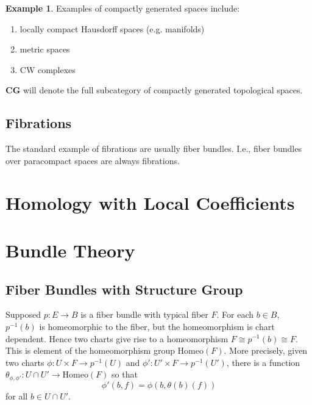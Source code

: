 \documentclass{article}
\theoremstyle{definition}
\newtheorem{ex}{Example}[section]
\newcommand{\cat}{\mathbf}
\begin{document}
    \begin{ex}
    Examples of compactly generated spaces include:
    \begin{enumerate}
    \item locally compact Hausdorff spaces (e.g. manifolds)
    \item metric spaces
    \item CW complexes
    \end{enumerate}
    \end{ex}
 $\cat{CG}$ will denote the full subcategory of compactly generated topological spaces. 
 \subsection{Fibrations}
 The standard example of fibrations are usually fiber bundles. I.e., fiber bundles over paracompact spaces are always fibrations. 
    \section{Homology with Local Coefficients}
    \section{Bundle Theory}
    \subsection{Fiber Bundles with Structure Group}
    Supposed $p:E\rightarrow B$ is a fiber bundle with typical fiber $F$. For each $b\in B$, $p^{-1}(b)$ is homeomorphic to the fiber, but the homeomorphism is chart dependent. Hence two charts give rise to a homeomorphism $F\cong p^{-1}(b)\cong F$. This is element of the homeomorphism group Homeo$(F)$. More precisely, given two charts $\phi:U\times F\rightarrow p^{-1}(U)$ and 
    $\phi':U'\times F\rightarrow p^{-1}(U')$, there is a function $\theta_{\phi,\phi'}:U\cap U'\rightarrow \text{Homeo}(F)$ so that 
    \[\phi'(b,f)=\phi(b,\theta(b)(f))\] for all $b\in U\cap U'.$
\end{document}
